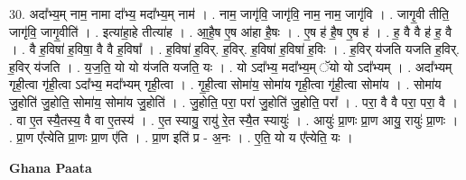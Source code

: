 \documentclass[17pt]{extarticle}
\begin{document}
30. अदा᳚भ्य॒म् नाम॒ नामा दा᳚भ्य॒ मदा᳚भ्य॒म् नाम॑ । . नाम॒ जागृ॑वि॒ जागृ॑वि॒ नाम॒ नाम॒ जागृ॑वि । . जागृ॒वी तीति॒ जागृ॑वि॒ जागृ॒वीति॑ । . इत्या॑हा॒हे तीत्या॑ह । . आ॒है॒ष ए॒ष आ॑हा है॒षः । . ए॒ष ह॑ है॒ष ए॒ष ह॑ । . ह॒ वै वै ह॑ ह॒ वै । . वै ह॒विषा॑ ह॒विषा॒ वै वै ह॒विषा᳚ । . ह॒विषा॑ ह॒विर्. ह॒विर्. ह॒विषा॑ ह॒विषा॑ ह॒विः । . ह॒विर् य॑जति यजति ह॒विर्. ह॒विर् य॑जति । . य॒ज॒ति॒ यो यो य॑जति यजति॒ यः । . यो ऽदा᳚भ्य॒ मदा᳚भ्य॒म् ॅयो यो ऽदा᳚भ्यम् । . अदा᳚भ्यम् गृही॒त्वा गृ॑ही॒त्वा ऽदा᳚भ्य॒ मदा᳚भ्यम् गृही॒त्वा । . गृ॒ही॒त्वा सोमा॑य॒ सोमा॑य गृही॒त्वा गृ॑ही॒त्वा सोमा॑य । . सोमा॑य जु॒होति॑ जु॒होति॒ सोमा॑य॒ सोमा॑य जु॒होति॑ । . जु॒होति॒ परा॒ परा॑ जु॒होति॑ जु॒होति॒ परा᳚ । . परा॒ वै वै परा॒ परा॒ वै । . वा ए॒त स्यै॒तस्य॒ वै वा ए॒तस्य॑ । . ए॒त स्यायु॒ रायु॑ रे॒त स्यै॒त स्यायुः॑ । . आयुः॑ प्रा॒णः प्रा॒ण आयु॒ रायुः॑ प्रा॒णः । . प्रा॒ण ए᳚त्येति प्रा॒णः प्रा॒ण ए॑ति । . प्रा॒ण इति॑ प्र - अ॒नः । . ए॒ति॒ यो य ए᳚त्येति॒ यः । \newline

\textbf{Ghana Paata } \newline
\end{document}
